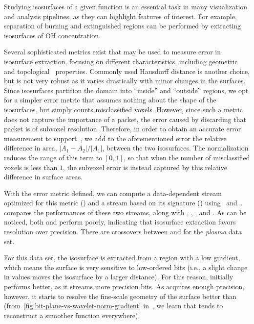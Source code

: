 Studying isosurfaces of a given function is an essential task in many visualization and analysis
pipelines, as they can highlight features of interest. For example, separation of burning and
extinguished regions can be performed by extracting isosurfaces of OH concentration.

Several sophisticated metrics exist that may be used to measure error in isosurface extraction,
focusing on different characteristics, including geometric~\cite{verifiable-isosurface} and
topological~\cite{topology-verification-isosurface} properties. Commonly used Hausdorff distance is
another choice, but is not very robust as it varies drastically with minor changes in the surfaces.
Since isosurfaces partition the domain into ``inside'' and ``outside''
regions, we opt for a simpler error metric that assumes nothing about the shape of
the isosurfaces, but simply counts misclassified voxels. However, since such a metric does not
capture the importance of a packet, the error caused by discarding that packet is of subvoxel
resolution. Therefore, in order to obtain an accurate error measurement to
support~, we add to the aforementioned error the relative difference in area,
$|A_1-A_2|/|A_1|$, between the two isosurfaces. The normalization reduces the range of this term to
$[0, 1]$, so that when the number of misclassified voxels is less than $1$, the subvoxel error is
instead captured by this relative difference in surface areas.

With the error metric defined, we can compute a data-dependent stream optimized for this metric (\siop)
and a stream based on its signature (\sisg) using~ and~.
 compares the performances of these two streams, along with \sbit, \slvl,
\swav, and \smag. As can be noticed, both \slvl and \smag perform poorly, indicating that
isosurface extraction favors resolution over precision. There are crossovers between \sbit and \swav
for the \emph{plasma} data set.

For this data set, the isosurface is extracted from a region with a low gradient, which means the
surface is very sensitive to low-ordered bits (i.e., a slight change in values moves the isosurface
by a larger distance). For this reason, \swav initially performs better, as it streams more precision
bits. As \sbit acquires enough precision, however, it starts to resolve the fine-scale geometry of
the surface better than \swav (from~\autoref{fig:bit-plane-vs-wavelet-norm-gradient}
in~, we learn that \swav tends to reconstruct a smoother function everywhere).

